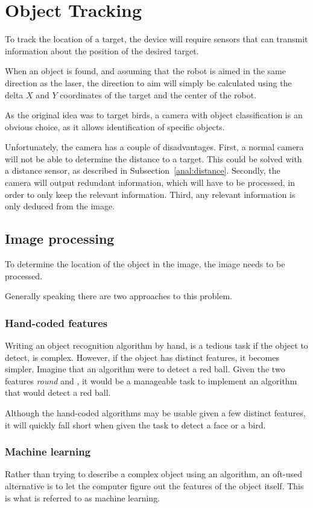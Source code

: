 \section{Object Tracking}
\label{sec:obj_tracking}
To track the location of a target, the device will require sensors that can transmit information about the position of the desired target.


When an object is found, and assuming that the robot is aimed in the same direction as the laser, the direction to aim will simply be calculated using the delta $X$ and $Y$ coordinates of the target and the center of the robot.

As the original idea was to target birds, a camera with object classification is an obvious choice, as it allows identification of specific objects.


Unfortunately, the camera has a couple of disadvantages.
First, a normal camera will not be able to determine the distance to a target.
This could be solved with a distance sensor, as described in Subsection~\ref{anal:distance}.
Secondly, the camera will output redundant information, which will have to be processed, in order to only keep the relevant information.
Third, any relevant information is only deduced from the image. 

\subsection{Image processing}
To determine the location of the object in the image, the image needs to be processed.

Generally speaking there are two approaches to this problem.
\subsubsection{Hand-coded features}
Writing an object recognition algorithm by hand, is a tedious task if the object to detect, is complex.
However, if the object has distinct features, it becomes simpler.
Imagine that an algorithm were to detect a red ball. 
Given the two features \textit{round} and , it would be a manageable task to implement an algorithm that would detect a red ball.

Although the hand-coded algorithms may be usable given a few distinct features, it will quickly fall short when given the task to detect a face or a bird.

\subsubsection{Machine learning}\label{sec:obj_tracking:sub:ML}
Rather than trying to describe a complex object using an algorithm, an oft-used alternative is to let the computer figure out the features of the object itself.
This is what is referred to as machine learning.

